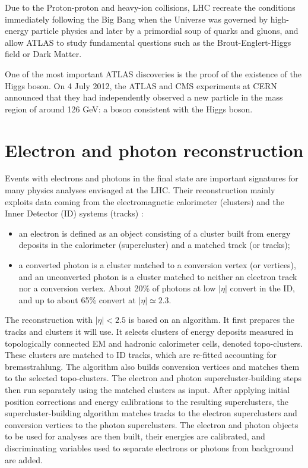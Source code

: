 \documentclass[a4paper, oneside]{book}
\begin{document}
			Due to the Proton-proton and heavy-ion collisions, LHC  recreate the conditions immediately following the Big Bang when the Universe was governed by high-energy particle physics and later by a primordial soup of quarks and gluons, and allow ATLAS to study fundamental questions such as the Brout-Englert-Higgs field or Dark Matter.
			
			One of the most important ATLAS discoveries is the proof of the existence of the Higgs boson. On 4 July 2012, the ATLAS and CMS experiments at CERN announced that they had independently observed a new particle in the mass region of around 126 GeV: a boson consistent with the Higgs boson.
				
	\chapter{Electron and photon reconstruction}
		Events with electrons and photons in the final state are important signatures for many physics analyses envisaged at the LHC. Their reconstruction mainly  exploits data coming from the electromagnetic calorimeter (clusters) and the Inner Detector (ID) systems (tracks) \cite{El ph intro}\cite{El ph reco}: 
		\begin{itemize}
			\item an electron is defined as an object consisting of a cluster built from energy deposits in the
			calorimeter (supercluster) and a matched track (or tracks);
			\item a  converted photon is a cluster matched to a conversion vertex (or vertices), and an unconverted photon is a cluster matched to neither an
			electron track nor a conversion vertex. About 20\% of photons at low $|\eta|$ convert in the ID, and up to about 65\% convert at $|\eta| \simeq 2.3$.
		\end{itemize}
		The reconstruction  with $|\eta| < 2.5$ is based on an algorithm. It first prepares the tracks and clusters it will use. It selects clusters of energy deposits measured in topologically connected EM and hadronic calorimeter cells, denoted topo-clusters. These clusters are matched to ID tracks, which are re-fitted accounting for bremsstrahlung. The algorithm also builds conversion vertices and matches them to the selected topo-clusters. The electron and photon supercluster-building steps then run separately using the matched clusters as input. After applying initial position corrections and energy
		calibrations to the resulting superclusters, the supercluster-building algorithm matches tracks to the electron superclusters and conversion vertices to the photon superclusters. The electron and photon
		objects to be used for analyses are then built, their energies are calibrated, and discriminating
		variables used to separate electrons or photons from background are added.
		
\end{document}
